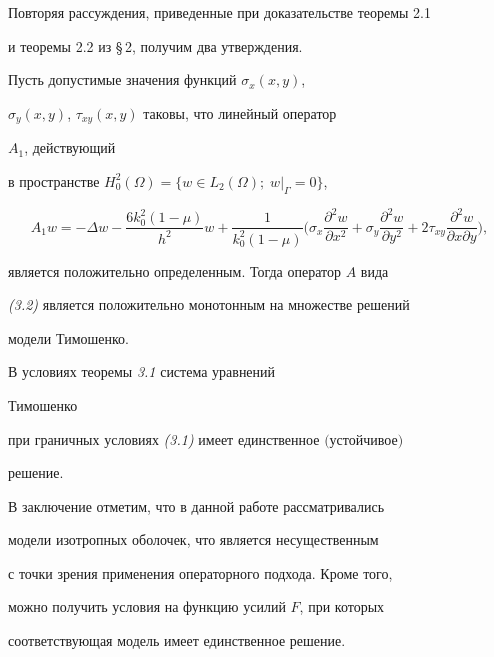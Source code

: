 Повторяя рассуждения, приведенные при доказательстве теоремы 2.1 


и теоремы 2.2 из \S\,2, получим два утверждения. 


 


\begin{thms} Пусть допустимые значения функций $\sigma_x(x,y)$, 


$\sigma_y(x,y)$, $\tau_{xy}(x,y)$ таковы, что линейный оператор 


$A_1$, действующий 


в пространстве $H^2_0(\Omega)=\{w\in L_2(\Omega);\;w|_\Gamma=0\}$, 


$$ 


A_1w=-\Delta w-\frac{6k^2_0(1-\mu)}{h^2}w+\frac{1}{k^2_0(1-\mu)} 


\biggl(\sigma_x\frac{\partial^2 w}{\partial x^2}+\sigma_y 


\frac{\partial^2 w}{\partial y^2}+2\tau_{xy} 


\frac{\partial^2 w}{\partial x\partial y}\biggr), 


$$ 


является положительно определенным. Тогда оператор $A$ вида 


{\em (3.2)} является положительно монотонным на множестве решений 


модели Тимошенко. 


\end{thms} 


 


\begin{thms} В условиях теоремы {\em 3.1} система уравнений 


Тимошенко 


при граничных условиях {\em (3.1)} имеет единственное $($устойчивое$)$ 


решение. 


\end{thms} 


 


В заключение отметим, что в данной работе рассматривались 


модели изотропных оболочек, что является несущественным 


с точки зрения применения операторного подхода. Кроме того, 


можно получить условия на функцию усилий $F$, при которых 


соответствующая модель имеет единственное решение. 


